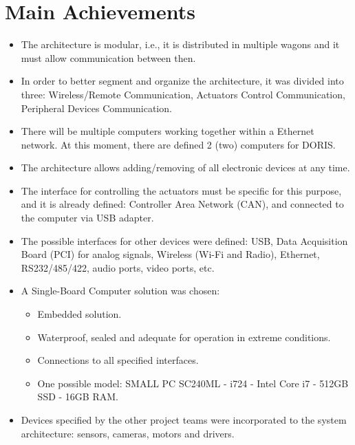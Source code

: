 \section{Main Achievements}
\begin{itemize}
    \item The architecture is modular, i.e., it is distributed in multiple wagons and it must allow communication between then.
    \item In order to better segment and organize the architecture, it was divided into three: Wireless/Remote Communication, Actuators Control Communication, Peripheral Devices Communication.
    \item There will be multiple computers working together within a Ethernet network. At this moment, there are defined 2 (two) computers for DORIS.
    \item The architecture allows adding/removing of all electronic devices at any time.
    \item The interface for controlling the actuators must be specific for this purpose, and it is already defined: Controller Area Network (CAN), and connected to the computer via USB adapter.
    \item The possible interfaces for other devices were defined: USB, Data Acquisition Board (PCI) for analog signals, Wireless (Wi-Fi and Radio), Ethernet, RS232/485/422, audio ports, video ports, etc.
    \item A Single-Board Computer solution was chosen:
    \begin{itemize}
        \item Embedded solution.
        \item Waterproof, sealed and adequate for operation in extreme conditions.
        \item Connections to all specified interfaces.
        \item One possible model: SMALL PC SC240ML - i724 - Intel Core i7 - 512GB SSD - 16GB RAM.
    \end{itemize}
    \item Devices specified by the other project teams were incorporated to the system architecture: sensors, cameras, motors and drivers.
\end{itemize}




